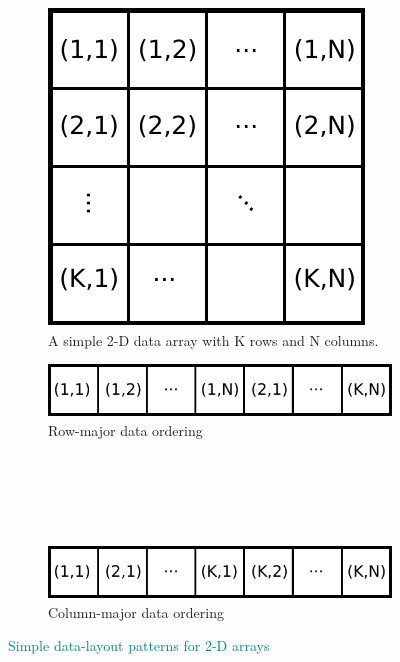 \documentclass[12pt,number,sort&compress,preprint]{elsarticle}
\newcommand{\add}[1]{{\sloppy\textcolor{teal}{#1}}}  %
\begin{document}
\begin{figure}[htb]
  \centering
  \begin{minipage}{0.45\linewidth}
    \begin{subfigure}[t]{\textwidth}
      \includegraphics[width=\textwidth]{data_layouts.pdf}
      \caption{A simple 2-D data array with K rows and N columns.}
      \label{F:mem}
    \end{subfigure}
  \end{minipage}
  \hfil
  \begin{minipage}{0.45\linewidth}
    \begin{subfigure}[t]{\textwidth}
	\includegraphics[width=\textwidth]{row_major.pdf}
	\caption{Row-major data ordering}
	\label{F:row_major}
    \end{subfigure}
    \\
    \\
    \\
    \\
    \begin{subfigure}[t]{\textwidth}
	\includegraphics[width=\textwidth]{column_major.pdf}
	\caption{Column-major data ordering}
	\label{F:column_major}
    \end{subfigure}
  \end{minipage}
  \caption{\add{Simple data-layout patterns for 2-D arrays}}
\end{figure}
\end{document}
